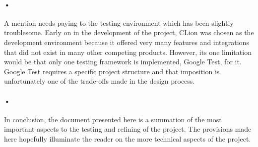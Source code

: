 \documentclass[11pt]{article}
\begin{document}
\paragraph{•}
A mention needs paying to the testing environment which has been slightly troublesome. Early on in the development of the project, CLion was chosen as the development environment because it offered very many features and integrations that did not exist in many other competing products. However, its one limitation would be that only one testing framework is implemented, Google Test, for it. Google Test requires a specific project structure and that imposition is unfortunately one of the trade-offs made in the design process.

\paragraph{•}
In conclusion, the document presented here is a summation of the most important aspects to the testing and refining of the project. The provisions made here hopefully illuminate the reader on the more technical aspects of the project.
\end{document}
